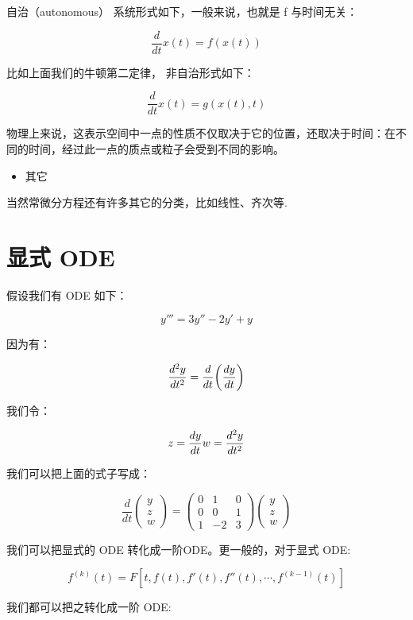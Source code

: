 \documentclass[
]{book}
\providecommand{\tightlist}{%
  \setlength{\itemsep}{0pt}\setlength{\parskip}{0pt}}
\begin{document}
自治（autonomous） 系统形式如下，一般来说，也就是 f 与时间无关：

\[
\frac{d}{dt}x(t)=f(x(t))
\]

比如上面我们的牛顿第二定律， 非自治形式如下：

\[
{\displaystyle {\frac {d}{dt}}x(t)=g(x(t),t)}
\]

物理上来说，这表示空间中一点的性质不仅取决于它的位置，还取决于时间：在不同的时间，经过此一点的质点或粒子会受到不同的影响。

\begin{itemize}
\tightlist
\item
  其它
\end{itemize}

当然常微分方程还有许多其它的分类，比如线性、齐次等.

\hypertarget{ux663eux5f0f-ode}{%
\section{显式 ODE}\label{ux663eux5f0f-ode}}

假设我们有 ODE 如下：

\[
y''' = 3y'' - 2y' + y
\]

因为有：

\[
\frac{d^2 y}{d t^2} = \frac{d}{dt} \bigg( {\frac{dy}{dt}} \bigg)\\
\]

我们令：

\[
z = \frac{dy}{dt}\\
w = \frac{d^2 y}{d t^2}
\]

我们可以把上面的式子写成：

\[
\frac{d}{d t}\begin{pmatrix} y \\ z \\ w \end{pmatrix} =  \begin{pmatrix} 0 & 1 & 0 \\ 0 & 0 & 1 \\ 1 & -2 & 3 \end{pmatrix}\begin{pmatrix} y \\ z \\ w \end{pmatrix} 
\]

我们可以把显式的 ODE 转化成一阶ODE。更一般的，对于显式 ODE:

\[f^{(k)}(t) = F[t, f(t), f'(t), f''(t), \cdots, f^{(k-1)}(t)] 
\]

我们都可以把之转化成一阶 ODE:
\end{document}
